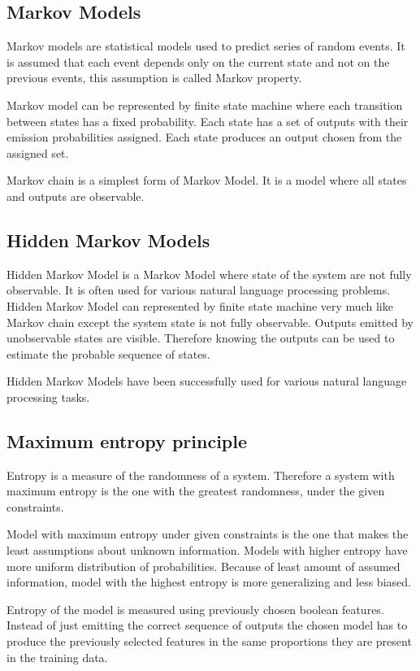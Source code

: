 \documentclass[thesis=B,english]{FITthesis}[2012/10/20]
\begin{document}
\subsection{Markov Models}
Markov models are statistical models used to predict series of random events. It is assumed that each event depends only on the current state and not on the previous events, this assumption is called Markov property. \par Markov model can be represented by finite state machine where each transition between states has a fixed probability. Each state has a set of outputs with their emission probabilities assigned. Each state produces an output chosen from the assigned set.
\par Markov chain is a simplest form of Markov Model. It is a model where all states and outputs are observable.

\subsection{Hidden Markov Models}
Hidden Markov Model is a Markov Model where state of the system are not fully observable. It is often used for various natural language processing problems. Hidden Markov Model can represented by finite state machine very much like Markov chain except the system state is not fully observable. Outputs emitted by unobservable states are visible. Therefore knowing the outputs can be used to estimate the probable sequence of states. 
\par Hidden Markov Models have been successfully used for various natural language processing tasks. 

\subsection{Maximum entropy principle}
Entropy is a measure of the randomness of a system. Therefore a system with maximum entropy is the one with the greatest randomness, under the given constraints.
\par Model with maximum entropy under given constraints is the one that makes the least assumptions about unknown information. Models with higher entropy have more uniform distribution of probabilities. Because of least amount of assumed information, model with the highest entropy is more generalizing and less biased.
\par Entropy of the model is measured using previously chosen boolean features. Instead of just emitting the correct sequence of outputs the chosen model has to produce the previously selected features in the same proportions they are present in the training data. 
\end{document}
